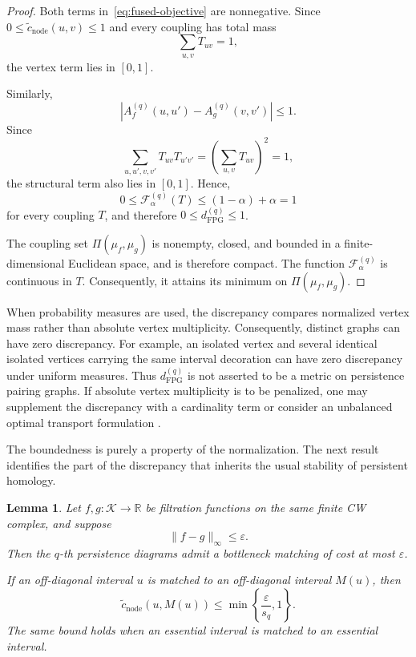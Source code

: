 \documentclass[11pt]{article}
\theoremstyle{paperdefinition}
\theoremstyle{paperplain}
\newtheorem{lemma}[definition]{Lemma}
\theoremstyle{paperremark}
\begin{document}
\begin{proof}
Both terms in~\eqref{eq:fused-objective} are nonnegative. Since $0 \leq \widetilde c_{\mathrm{node}}(u,v) \leq 1$ and every coupling has total mass
\[
\sum_{u,v}T_{uv}=1,
\]
the vertex term lies in $[0,1]$.

Similarly,
\[
\left|A_f^{(q)}(u,u') - A_g^{(q)}(v,v') \right| \leq1.
\]
Since
\[
\sum_{u,u',v,v'} T_{uv}T_{u'v'} = \left(\sum_{u,v}T_{uv}\right)^2 = 1,
\]
the structural term also lies in $[0,1]$. Hence,
\[
0 \leq \mathcal F_\alpha^{(q)}(T) \leq (1-\alpha)+\alpha = 1
\]
for every coupling $T$, and therefore $0 \leq d_{\mathrm{FPG}}^{(q)} \leq 1$.

The coupling set $\Pi(\mu_f,\mu_g)$ is nonempty, closed, and bounded in a finite-dimensional Euclidean space, and is therefore compact. The function $\mathcal F_\alpha^{(q)}$ is continuous in $T$. Consequently, it attains its minimum on $\Pi(\mu_f,\mu_g)$.
\end{proof}

When probability measures are used, the discrepancy compares normalized vertex mass rather than absolute vertex multiplicity. Consequently, distinct graphs can have zero discrepancy. For example, an isolated vertex and several identical isolated vertices carrying the same interval decoration can have zero discrepancy under uniform measures. Thus $d_{\mathrm{FPG}}^{(q)}$ is not asserted to be a metric on persistence pairing graphs. If absolute vertex multiplicity is to be penalized, one may supplement the discrepancy with a cardinality term or consider an unbalanced optimal transport formulation \cite{chizat2018scaling}.

The boundedness is purely a property of the normalization. The next result identifies the part of the discrepancy that inherits the usual stability of persistent homology.

\begin{lemma}
\label{lem:node-stability}
Let $f,g:\mathcal K\longrightarrow\mathbb R$ be filtration functions on the same finite CW complex, and suppose
\[
\|f-g\|_\infty \leq \varepsilon.
\]
Then the $q$-th persistence diagrams admit a bottleneck matching of cost at most $\varepsilon$.

If an off-diagonal interval $u$ is matched to an off-diagonal interval $M(u)$, then
\[
\widetilde c_{\mathrm{node}}(u,M(u)) \leq \min\left\{\frac{\varepsilon}{s_q}, 1\right\}.
\]
The same bound holds when an essential interval is matched to an essential interval.
\end{lemma}
\end{document}
